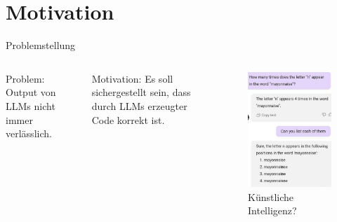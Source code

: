 \documentclass{beamer}              %
\begin{document}
\section{Motivation}
\begin{frame}{Problemstellung}
	\begin{columns}
Problem: Output von LLMs nicht immer verlässlich.

\vspace{30mm}

Motivation: Es soll sichergestellt sein, dass durch LLMs erzeugter Code korrekt ist.
        \begin{figure}
        \centering
        \includegraphics[width=0.35\paperwidth]{images/mayonnaise.png}
        \caption{Künstliche Intelligenz?\cite{mayonnaise:reddit}}
        \label{fig:stry}
    \end{figure}
    \end{columns}
\end{frame}
\end{document}

